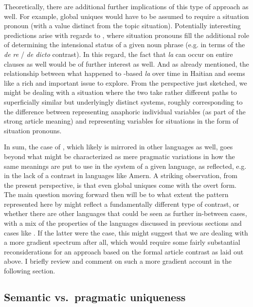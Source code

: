 \documentclass[output=paper
,modfonts
,nonflat]{langscibook}
\begin{document}
Theoretically, there are additional further implications of this type
of approach as well. For example, global uniques would have to be
assumed to require a situation pronoun (with a value distinct from the
topic situation). Potentially interesting predictions arise with
regards to , where situation pronouns fill the
additional role of determining the intensional status of a
given noun phrase (e.g. in terms of the \textit{de re} / \textit{de dicto}
contrast). In this regard, the fact that \textit{la} can occur on
entire clauses as well would be of further interest as well. And as
already mentioned, the relationship between what happened to
-based \textit{la} over time in Haitian and 
seems like a rich and important issue to explore. From the perspective
just sketched, we might be dealing with a situation where the two take
rather different paths to superficially similar but underlyingly
distinct systems, roughly corresponding to the difference between
representing anaphoric individual variables (as part of the strong
article meaning) and representing variables for situations in the form
of situation pronouns.

In sum, the case of , which likely is mirrored in other
languages as well, goes beyond what might be characterized as mere
pragmatic variations in how the same meanings are put to use in the
system of a given language, as reflected, e.g. in the lack of a
 contrast in languages like Amern. A striking observation, from the
present perspective, is that even global uniques come with the overt
form. The main question moving forward then will be to what extent the
pattern represented here by  might reflect a
fundamentally different type of contrast, or whether there are other
languages that could be seen as further in-between cases, with a mix of
the properties of the languages discussed in previous sections and
cases like . If the latter were the case, this might
suggest that we are dealing with a more gradient spectrum after all,
which would require some fairly substantial reconsiderations for an
approach based on the formal article contrast as laid out above. I
briefly review and comment on such a more gradient account in the
following section.

\subsection{Semantic vs.\ pragmatic uniqueness}
\end{document}
